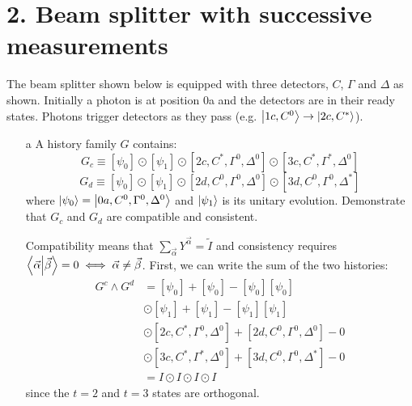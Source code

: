 \documentclass[a4paper,twoside]{article}
\begin{document}
\section*{2. Beam splitter with successive measurements}
The beam splitter shown below is equipped with three detectors, $ C $, $ \Gamma $ and $ \Delta $ as shown. Initially a photon is at position 0a and the detectors are in their ready states. Photons trigger detectors as they pass (e.g. $ \ket{1c,C^0} \to \ket{2c,C^*} $).
\begin{itemize}
    \item[a] A history family $ G $ contains:
        \begin{equation}
            G_c \equiv [\psi_0] \odot [\psi_1] \odot [2c,C^*, \Gamma^0, \Delta^0] \odot [3c,C^*, \Gamma^*, \Delta^0]
        \end{equation}
        \begin{equation}
            G_d \equiv [\psi_0] \odot [\psi_1] \odot [2d,C^0, \Gamma^0, \Delta^0] \odot [3d,C^0, \Gamma^0, \Delta^*]
        \end{equation}
        where $ \ket{\psi_0} = \ket{0a,C^0, \Gamma^0, \Delta^0} $ and $ \ket{\psi_1} $ is its unitary evolution. Demonstrate that $ G_c $ and $ G_d $ are compatible and consistent.
        \begin{tcolorbox}[breakable]
            Compatibility means that $ \sum_{ \vec{\alpha}} Y^{ \vec{\alpha}} = \tilde{I} $ and consistency requires $ \bra{ \vec{\alpha}} \ket{ \vec{\beta}} = 0 \iff \vec{\alpha} \neq \vec{\beta} $. First, we can write the sum of the two histories:
            \begin{align}
                G^c \wedge G^d &= [\psi_0] + [\psi_0] - [\psi_0][\psi_0]\\
                &\odot [\psi_1] + [\psi_1] - [\psi_1][\psi_1]\\
                &\odot [2c,C^*, \Gamma^0, \Delta^0] + [2d,C^0, \Gamma^0, \Delta^0] - 0\\
                &\odot [3c,C^*, \Gamma^*, \Delta^0] + [3d,C^0, \Gamma^0, \Delta^*] - 0\\
                &= I \odot I \odot I \odot I
            \end{align} since the $ t=2 $ and $ t=3 $ states are orthogonal.


\end{tcolorbox}
\end{itemize}
\end{document}
